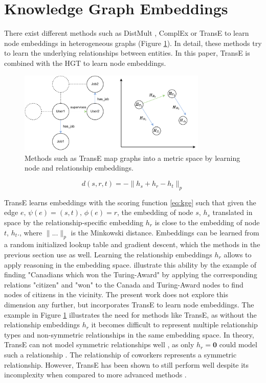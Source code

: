 \section{Knowledge Graph Embeddings}

There exist different methods such as DistMult \parencite{yang2014embedding}, ComplEx \parencite{trouillon2016complex} or TransE \parencite{bordes2013translating} to learn node embeddings in heterogeneous graphs (Figure \ref{fig:kge}). In detail, these methods try to learn the underlying relationships between entities. In this paper, TransE is combined with the HGT to learn node embeddings. 

\begin{figure}
    \centering
    \includegraphics[width=0.8\textwidth]{img/kge.drawio (3).pdf}
    \caption[Learning node embeddings with TransE]{ Methods such as TransE map graphs into a metric space by learning node  and relationship embeddings.}
    \label{fig:kge}
   
\end{figure}
\begin{equation}
d(s,r,t) = - \| h_s + h_r -h_t \|_p
\label{eq:kge}
\end{equation}

TransE learns embeddings with the scoring function \eqref{eq:kge} such that given the edge $e, \, \psi(e)=(s,t), \, \phi(e)=r$, the embedding of node $s$, $h_s$ translated in space by the relationship-specific embedding $h_r$ is close to the embedding of node $t$, $h_t$., where  $\|... \|_p$ is the Minkowski distance. Embeddings can be learned from a random initialized lookup table and gradient descent, which the methods in the previous section use as well. Learning the relationship embeddings $h_r$ allows to apply reasoning in the embedding space. \textcite{ren2020query2box} illustrate this ability by the example of finding "Canadians which won the Turing-Award" by applying the corresponding relations "citizen" and "won" to the Canada and Turing-Award nodes to find nodes of citizens in the vicinity. The present work does not explore this dimension any further, but incorporates TransE to learn node embeddings. The example in Figure \ref{fig:kge} illustrates the need for methods like TransE, as without the relationship embeddings $h_r$ it becomes difficult to represent multiple relationship types and non-symmetric relationships in the same embedding space.  In theory, TransE can not model symmetric relationships well \parencite{sun2019rotate}, as only $h_r=\mathbf{0}$ could model such a relationship . The relationship of coworkers represents a symmetric relationship. However, TransE has been shown to still perform well despite its incomplexity when compared to more advanced methods \parencite{sun2019rotate}.



